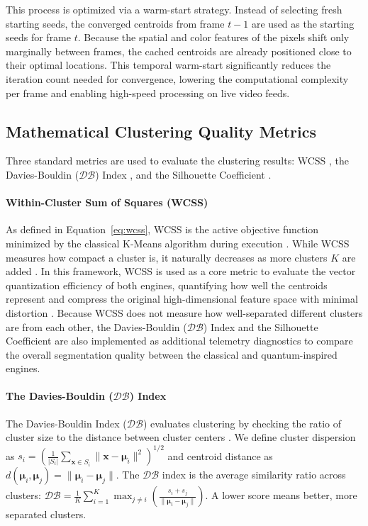 This process is optimized via a warm-start strategy. Instead of selecting fresh starting seeds, the converged centroids from frame $t-1$ are used as the starting seeds for frame $t$. Because the spatial and color features of the pixels shift only marginally between frames, the cached centroids are already positioned close to their optimal locations. This temporal warm-start significantly reduces the iteration count needed for convergence, lowering the computational complexity per frame and enabling high-speed processing on live video feeds.

\subsection{Mathematical Clustering Quality Metrics}\label{subsect:metrics_def}
Three standard metrics are used to evaluate the clustering results: WCSS \cite{krzanowski1988criterion}, the Davies-Bouldin ($\mathcal{D}\mathcal{B}$) Index \cite{davies1979cluster, xiao2017davies}, and the Silhouette Coefficient \cite{rousseeuw1987silhouettes, shutaywi2021silhouette}.

\paragraph{Within-Cluster Sum of Squares (WCSS)}
As defined in Equation~\ref{eq:wcss}, WCSS is the active objective function minimized by the classical K-Means algorithm during execution \cite{lloyd1982least}. While WCSS measures how compact a cluster is, it naturally decreases as more clusters $K$ are added \cite{krzanowski1988criterion}. In this framework, WCSS is used as a core metric to evaluate the vector quantization efficiency of both engines, quantifying how well the centroids represent and compress the original high-dimensional feature space with minimal distortion \cite{lloyd1982least}. Because WCSS does not measure how well-separated different clusters are from each other, the Davies-Bouldin ($\mathcal{D}\mathcal{B}$) Index \cite{xiao2017davies,davies1979cluster} and the Silhouette Coefficient \cite{shutaywi2021silhouette,rousseeuw1987silhouettes} are also implemented as additional telemetry diagnostics to compare the overall segmentation quality between the classical and quantum-inspired engines.

\paragraph{The Davies-Bouldin ($\mathcal{D}\mathcal{B}$) Index}
The Davies-Bouldin Index ($\mathcal{D}\mathcal{B}$) evaluates clustering by checking the ratio of cluster size to the distance between cluster centers \cite{xiao2017davies,davies1979cluster}. We define cluster dispersion as $s_i = \left( \frac{1}{|S_i|} \sum_{\mathbf{x} \in S_i} \|\mathbf{x} - \boldsymbol{\mu}_i\|^2 \right)^{1/2}$ and centroid distance as $d(\boldsymbol{\mu}_i, \boldsymbol{\mu}_j) = \|\boldsymbol{\mu}_i - \boldsymbol{\mu}_j\|$. The $\mathcal{D}\mathcal{B}$ index is the average similarity ratio across clusters: $\mathcal{D}\mathcal{B} = \frac{1}{K} \sum_{i=1}^{K} \max_{j \neq i} \left( \frac{s_i + s_j}{\|\boldsymbol{\mu}_i - \boldsymbol{\mu}_j\|} \right)$. A lower score means better, more separated clusters.

